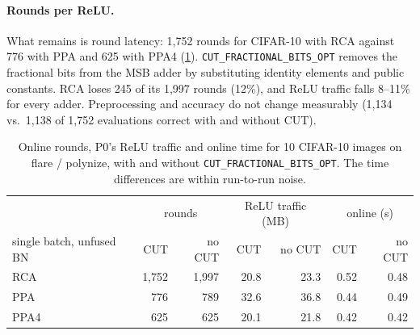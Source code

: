 \documentclass[10pt,a4paper]{article}
\newcommand{\flag}[1]{\nolinkurl{#1}}
\begin{document}
\paragraph{Rounds per ReLU.} What remains is round latency: 1,752 rounds for CIFAR-10 with RCA against 776
with PPA and 625 with PPA4 (\cref{tab:cut}). \flag{CUT_FRACTIONAL_BITS_OPT} removes the fractional bits
from the MSB adder by substituting identity elements and public constants. RCA loses 245 of its 1,997
rounds (12\%), and ReLU traffic falls 8--11\% for every adder. Preprocessing and accuracy do not change
measurably (1,134 vs.\ 1,138 of 1,752 evaluations correct with and without CUT).

\begin{table}[t]
\centering\small
\begin{tabular}{@{}lrrrrrr@{}}
\toprule
& \multicolumn{2}{c}{rounds} & \multicolumn{2}{c}{ReLU traffic (MB)} & \multicolumn{2}{c}{online (s)}\\
single batch, unfused BN & CUT & no CUT & CUT & no CUT & CUT & no CUT\\
\midrule
RCA  & 1,752 & 1,997 & 20.8 & 23.3 & 0.52 & 0.48\\
PPA  & 776 & 789 & 32.6 & 36.8 & 0.44 & 0.49\\
PPA4 & 625 & 625 & 20.1 & 21.8 & 0.42 & 0.42\\
\bottomrule
\end{tabular}
\caption{Online rounds, P0's ReLU traffic and online time for 10 CIFAR-10 images on flare / polynize,
with and without \flag{CUT_FRACTIONAL_BITS_OPT}. The time differences are within run-to-run noise.}
\label{tab:cut}
\end{table}
\end{document}
